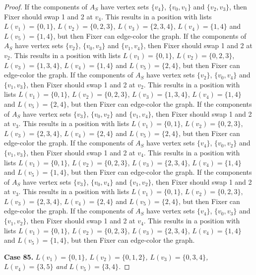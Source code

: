 \documentclass[12pt]{amsart}
\theoremstyle{plain}
\theoremstyle{definition}
\theoremstyle{remark}
\begin{document}
\begin{proof}
If the components of $A_S$ have vertex sets $\{v_4\}$, $\{v_0, v_1\}$ and $\{v_2, v_3\}$, then Fixer should swap 1 and 2 at $v_4$. This results in a position with lists $L(v_1) = \{0, 1\}$, $L(v_2) = \{0, 2, 3\}$, $L(v_3) = \{2, 3, 4\}$, $L(v_4) = \{1, 4\}$ and $L(v_5) = \{1, 4\}$, but then Fixer can edge-color the graph.
If the components of $A_S$ have vertex sets $\{v_2\}$, $\{v_0, v_3\}$ and $\{v_1, v_4\}$, then Fixer should swap 1 and 2 at $v_2$. This results in a position with lists $L(v_1) = \{0, 1\}$, $L(v_2) = \{0, 2, 3\}$, $L(v_3) = \{1, 3, 4\}$, $L(v_4) = \{1, 4\}$ and $L(v_5) = \{2, 4\}$, but then Fixer can edge-color the graph.
If the components of $A_S$ have vertex sets $\{v_2\}$, $\{v_0, v_4\}$ and $\{v_1, v_3\}$, then Fixer should swap 1 and 2 at $v_2$. This results in a position with lists $L(v_1) = \{0, 1\}$, $L(v_2) = \{0, 2, 3\}$, $L(v_3) = \{1, 3, 4\}$, $L(v_4) = \{1, 4\}$ and $L(v_5) = \{2, 4\}$, but then Fixer can edge-color the graph.
If the components of $A_S$ have vertex sets $\{v_3\}$, $\{v_0, v_2\}$ and $\{v_1, v_4\}$, then Fixer should swap 1 and 2 at $v_3$. This results in a position with lists $L(v_1) = \{0, 1\}$, $L(v_2) = \{0, 2, 3\}$, $L(v_3) = \{2, 3, 4\}$, $L(v_4) = \{2, 4\}$ and $L(v_5) = \{2, 4\}$, but then Fixer can edge-color the graph.
If the components of $A_S$ have vertex sets $\{v_4\}$, $\{v_0, v_2\}$ and $\{v_1, v_3\}$, then Fixer should swap 1 and 2 at $v_4$. This results in a position with lists $L(v_1) = \{0, 1\}$, $L(v_2) = \{0, 2, 3\}$, $L(v_3) = \{2, 3, 4\}$, $L(v_4) = \{1, 4\}$ and $L(v_5) = \{1, 4\}$, but then Fixer can edge-color the graph.
If the components of $A_S$ have vertex sets $\{v_3\}$, $\{v_0, v_4\}$ and $\{v_1, v_2\}$, then Fixer should swap 1 and 2 at $v_3$. This results in a position with lists $L(v_1) = \{0, 1\}$, $L(v_2) = \{0, 2, 3\}$, $L(v_3) = \{2, 3, 4\}$, $L(v_4) = \{2, 4\}$ and $L(v_5) = \{2, 4\}$, but then Fixer can edge-color the graph.
If the components of $A_S$ have vertex sets $\{v_4\}$, $\{v_0, v_3\}$ and $\{v_1, v_2\}$, then Fixer should swap 1 and 2 at $v_4$. This results in a position with lists $L(v_1) = \{0, 1\}$, $L(v_2) = \{0, 2, 3\}$, $L(v_3) = \{2, 3, 4\}$, $L(v_4) = \{1, 4\}$ and $L(v_5) = \{1, 4\}$, but then Fixer can edge-color the graph.

\noindent\textbf{Case 85.  }\textit{$L(v_1) = \{0, 1\}$, $L(v_2) = \{0, 1, 2\}$, $L(v_3) = \{0, 3, 4\}$, $L(v_4) = \{3, 5\}$ and $L(v_5) = \{3, 4\}$.}


\end{proof}
\end{document}
